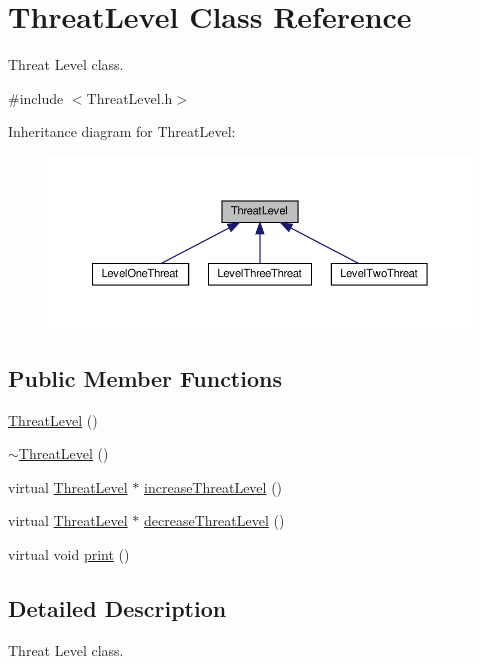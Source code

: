 \hypertarget{classThreatLevel}{}\section{Threat\+Level Class Reference}
\label{classThreatLevel}


Threat Level class.  




{\ttfamily \#include $<$Threat\+Level.\+h$>$}



Inheritance diagram for Threat\+Level\+:\nopagebreak
\begin{figure}[H]
\begin{center}
\leavevmode
\includegraphics[width=350pt]{classThreatLevel__inherit__graph}
\end{center}
\end{figure}
\subsection*{Public Member Functions}
\begin{DoxyCompactItemize}
\item 
\hyperlink{classThreatLevel_a18dc853a3ac3b4db9ec7495dae72f8fb}{Threat\+Level} ()
\item 
\hyperlink{classThreatLevel_ad69b03a01e63cffeca7656155d4e0849}{$\sim$\+Threat\+Level} ()
\item 
virtual \hyperlink{classThreatLevel}{Threat\+Level} $\ast$ \hyperlink{classThreatLevel_ae18f6ebe2186ae1b61d4817196f969e3}{increase\+Threat\+Level} ()
\item 
virtual \hyperlink{classThreatLevel}{Threat\+Level} $\ast$ \hyperlink{classThreatLevel_a3545ec161fbe4c01beafb9b43624c7e8}{decrease\+Threat\+Level} ()
\item 
virtual void \hyperlink{classThreatLevel_a5bdff5eeffed8db616ca06091097c138}{print} ()
\end{DoxyCompactItemize}


\subsection{Detailed Description}
Threat Level class. 

